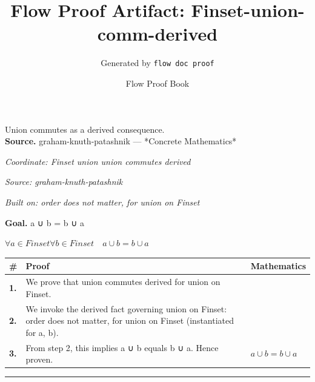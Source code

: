 \documentclass[11pt]{article}
\title{Flow Proof Artifact: Finset-union-comm-derived}
\author{Generated by \texttt{flow doc proof}}
\date{Flow Proof Book}
\theoremstyle{definition}
\begin{document}
\maketitle
Union commutes as a derived consequence.\\[0.5em]
\textbf{Source.} graham-knuth-patashnik — *Concrete Mathematics*\\[0.5em]
\bigskip
{}\par
\smallskip\noindent\textit{Coordinate: Finset \cdot union \cdot union commutes derived}\par
\smallskip\noindent\textit{Source: graham-knuth-patashnik}\par
\smallskip\noindent\textit{Built on: order does not matter, for union on Finset}\par
\medskip
\noindent\textbf{Goal.} a ∪ b = b ∪ a\par
\noindent$\displaystyle \forall a \in Finset \forall b \in Finset\quad a ∪ b = b ∪ a$\par
\medskip
\noindent
\begin{tabular}{@{} >{\raggedright\arraybackslash}p{} >{\raggedright\arraybackslash}p{} >{\raggedleft\arraybackslash}p{} @{}}
\textbf{\#} & \textbf{Proof} & \textbf{Mathematics} \\
\midrule
\textbf{1.} & We prove that union commutes derived for union on Finset. & \\[0.45em]
\textbf{2.} & We invoke the derived fact governing union on Finset: order does not matter, for union on Finset (instantiated for a, b). & \\[0.45em]
\textbf{3.} & From step 2, this implies a ∪ b equals b ∪ a. Hence proven. & $\displaystyle a ∪ b = b ∪ a$ \\[0.45em]
\bottomrule
\end{tabular}
\label{thm:Finset-union-union_commutes_derived}
\par\medskip\hrule
\end{document}
